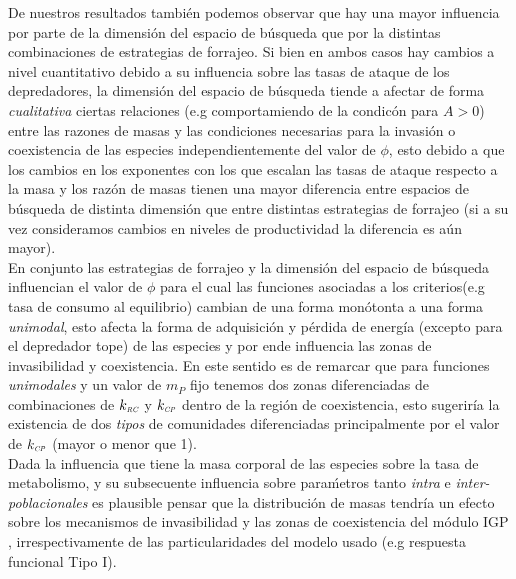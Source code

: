 De nuestros resultados tambi\'en podemos observar que hay una mayor influencia por parte de la dimensi\'on del espacio de b\'usqueda que por la distintas combinaciones de estrategias de forrajeo. Si bien en ambos casos hay cambios a nivel cuantitativo debido a su influencia sobre las tasas de ataque de los depredadores, la dimensi\'on del espacio de b\'usqueda tiende a afectar de forma \emph{cualitativa} ciertas relaciones (e.g comportamiendo de la condic\'on para $A >0$) entre las razones de masas y las condiciones necesarias para la invasi\'on o coexistencia de las especies independientemente del valor de $\phi$, esto debido a que los cambios en los exponentes con los que escalan las tasas de ataque respecto a la masa y los raz\'on de masas tienen una mayor diferencia entre espacios de b\'usqueda de distinta dimensi\'on que entre distintas estrategias de forrajeo (si a su vez consideramos cambios en niveles de productividad la diferencia es a\'un mayor). \\

En conjunto las estrategias de forrajeo y la dimensi\'on del espacio de b\'usqueda influencian el valor de $\phi$ para el cual las funciones asociadas a los criterios(e.g tasa de consumo al equilibrio) cambian de una forma mon\'otonta a una forma \emph{unimodal}, esto afecta la forma de adquisici\'on y p\'erdida de energ\'ia (excepto para el depredador tope) de las especies y por ende influencia las zonas de invasibilidad y coexistencia. En este sentido es de remarcar que para funciones \emph{unimodales} y un valor de $m_P$ fijo tenemos dos zonas diferenciadas de combinaciones de $k_{\textit{\tiny RC}}$ y $k_{\textit{\tiny CP}}$ dentro de la regi\'on de coexistencia, esto sugerir\'ia la existencia de dos \emph{tipos} de comunidades diferenciadas principalmente por el valor de $k_{\textit{\tiny CP}}$ (mayor o menor que 1). \\

Dada la influencia que tiene la masa corporal de las especies sobre la tasa de metabolismo, y su subsecuente influencia sobre para\'metros tanto \emph{intra} e \emph{inter-poblacionales} \citep{savage2004predominance,brown2004toward,west1997general,savage2004effects,pawar2012dimensionality,mcgill2006allometric,peters1986ecological,kiltie2000scaling,yodzis1992body} es plausible pensar que la distribuci\'on de masas tendr\'ia un efecto sobre los mecanismos de invasibilidad y las zonas de coexistencia del m\'odulo IGP , irrespectivamente de las particularidades del modelo usado (e.g respuesta funcional Tipo I).\\



